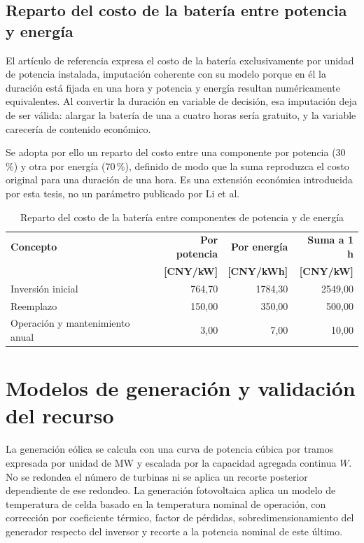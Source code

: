 \subsection{Reparto del costo de la batería entre potencia y energía}
\label{sec:reparto_bateria}

El artículo de referencia expresa el costo de la batería exclusivamente por unidad de potencia instalada, imputación coherente con su modelo porque en él la duración está fijada en una hora y potencia y energía resultan numéricamente equivalentes. Al convertir la duración en variable de decisión, esa imputación deja de ser válida: alargar la batería de una a cuatro horas sería gratuito, y la variable carecería de contenido económico.

Se adopta por ello un reparto del costo entre una componente por potencia (30\,\%) y otra por energía (70\,\%), definido de modo que la suma reproduzca el costo original para una duración de una hora. Es una extensión económica introducida por esta tesis, no un parámetro publicado por Li et al.

\begin{table}[H]
\centering
\footnotesize
\caption{Reparto del costo de la batería entre componentes de potencia y de energía}
\label{tab:reparto_bateria}
\renewcommand{\arraystretch}{1.2}
\begin{tabular}{l r r r}
\hline
\textbf{Concepto} & \textbf{Por potencia} & \textbf{Por energía} & \textbf{Suma a 1 h} \\
 & \textbf{[CNY/kW]} & \textbf{[CNY/kWh]} & \textbf{[CNY/kW]} \\
\hline
Inversión inicial & 764{,}70 & 1784{,}30 & 2549{,}00 \\
Reemplazo & 150{,}00 & 350{,}00 & 500{,}00 \\
Operación y mantenimiento anual & 3{,}00 & 7{,}00 & 10{,}00 \\
\hline
\end{tabular}
\end{table}

\section{Modelos de generación y validación del recurso}

La generación eólica se calcula con una curva de potencia cúbica por tramos expresada por unidad de MW y escalada por la capacidad agregada continua $W$. No se redondea el número de turbinas ni se aplica un recorte posterior dependiente de ese redondeo. La generación fotovoltaica aplica un modelo de temperatura de celda basado en la temperatura nominal de operación, con corrección por coeficiente térmico, factor de pérdidas, sobredimensionamiento del generador respecto del inversor y recorte a la potencia nominal de este último.

